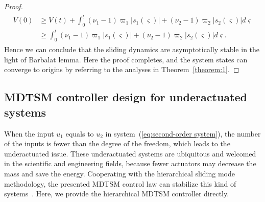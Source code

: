 \documentclass[3p]{elsarticle}
\theoremstyle{plain}
\theoremstyle{remark}
\begin{document}
{\begin{proof}
\begin{align}\begin{split}
V(0)&\ge V(t)+\int_0^t(\nu_1-1)\varpi_1\vert s_1(\varsigma)\vert+(\nu_2-1)\varpi_2\vert s_2(\varsigma)\vert d\varsigma\\
&\ge\int_0^t(\nu_1-1)\varpi_1\vert s_1(\varsigma)\vert+(\nu_2-1)\varpi_2\vert s_2(\varsigma)\vert d\varsigma.
\end{split}\end{align}
Hence we can conclude that the sliding dynamics are asymptotically stable in the light of Barbalat lemma. Here the proof completes, and the system states can converge to origins by referring to the analyses in Theorem~\ref{theorem:1}.
\end{proof}
}
\subsection{MDTSM controller design for underactuated systems}
When the input $u_1$ equals to $u_2$ in system~(\ref{eq:second-order system}), the number of the inputs is fewer than the degree of the freedom, which leads to the underactuated issue. These underactuated systems are ubiquitous and welcomed in the scientific and engineering fields, because fewer actuators may decrease the mass and save the energy. Cooperating with the hierarchical sliding mode methodology, the presented MDTSM control law can stabilize this kind of systems~\cite{wang2004design}. Here, we provide the hierarchical MDTSM controller directly.
\end{document}
